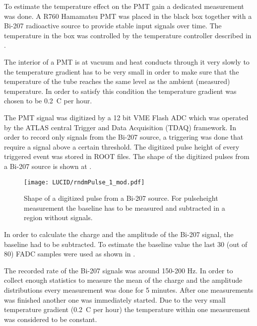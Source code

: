 To estimate the temperature effect on the PMT gain a dedicated measurement was done. 
A R760 Hamamatsu PMT was placed in the black box together with a Bi-207 radioactive source
to provide stable input signals over time. The temperature in the box was controlled by the temperature controller described in 
.

The interior of a PMT is at vacuum and heat conducts through it very slowly to the temperature gradient has to be very small in order to make sure 
that the temperature of the tube reaches the same level as the ambient (measured) temperature.
In order to satisfy this condition the temperature gradient was chosen to be 0.2\degree~C per hour.

The PMT signal was digitized by a 12 bit VME Flash ADC which was operated by the ATLAS central Trigger and Data Acquisition (TDAQ) framework.
In order to record only signals from the Bi-207 source, a triggering was done that require a signal above a certain threshold.
The digitized pulse height of every triggered event was stored in ROOT files.
The shape of the digitized pulses from a Bi-207 source is shown at . 

\begin{figure}
\centering
\texttt{[image: LUCID/rndmPulse\_1\_mod.pdf]}
\caption{Shape of a digitized pulse from a Bi-207 source. For pulseheight measurement the baseline has to be measured and subtracted in a region without signals.}
\label{fig:bi207DigitizedPulse}
\end{figure}

In order to calculate the charge and the amplitude of the Bi-207 signal, the baseline had to be subtracted. 
To estimate the baseline value the last 30 (out of 80) FADC samples were used as shown in .

The recorded rate of the Bi-207 signals was around 150-200 Hz. In order to collect enough statistics to measure the mean of the charge and 
the amplitude distributions every measurement was done for 5 minutes. 
After one measurements was finished another one was immediately started.
Due to the very small temperature gradient (0.2\degree~C per hour) the temperature within one measurement was considered to be constant.

